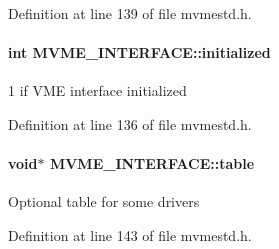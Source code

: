 Definition at line 139 of file mvmestd.h.
\paragraph[{initialized}]{\setlength{\rightskip}{0pt plus 5cm}int {\bf MVME\_\-INTERFACE::initialized}}\hfill\label{structMVME__INTERFACE_a594b981e168e22b18145e20147b48707}
1 if VME interface initialized 

Definition at line 136 of file mvmestd.h.
\paragraph[{table}]{\setlength{\rightskip}{0pt plus 5cm}void$\ast$ {\bf MVME\_\-INTERFACE::table}}\hfill\label{structMVME__INTERFACE_a5af88063fb0f01dfcfd8438a2cd2a0f0}
Optional table for some drivers 

Definition at line 143 of file mvmestd.h.